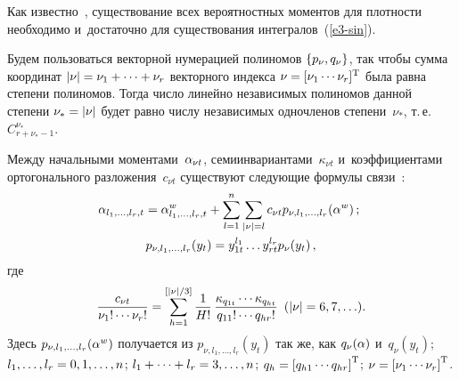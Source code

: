 \begin{multicols}{2}
Как известно~\cite{1-sin, 2-sin}, существование всех вероятностных моментов
для плот\-ности необходимо и~достаточно для существования интегралов~(\ref{e3-sin}).

Будем пользоваться векторной нумерацией полиномов
$\left\{ p_\nu, q_\nu\right\}$, так чтобы сумма координат
$|\nu | \hm= \nu_1 +\cdots +\nu_r$ векторного индекса
$\nu \hm= [\nu_1 \cdots \nu_r]^{\mathrm{T}}$ была равна степени полиномов.
Тогда число линейно независимых полиномов данной степени $\nu_* \hm= |\nu |$
будет равно числу независимых одночленов степени~$\nu_*$, т.\,е.\
$C_{r+\nu_*-1}^{\nu_*}$.

Между начальными  моментами~$\alpha_{\nu t}$, семиинвариантами~$\kappa_{\nu t}$
и~коэффициентами ортогонального разложения~$c_{\nu t}$
существуют следующие формулы связи~\cite{1-sin, 2-sin}:
    \begin{gather}
    \!\!\alpha_{l_1, \ldots,  l_r, t} =
    \alpha_{l_1, \ldots , l_r, t}^w + \sum\limits_{l=1}^n
    \sum\limits_{|\nu |=l} c_{\nu t} p_{\nu, l_1,\ldots,  l_r} (\alpha^w)\,;\notag
    \\
    p_{\nu, l_1, \ldots , l_r} (y_t) = y_{1t}^{l_1} \ldots y_{rt}^{l_r}
    p_\nu (y_t)\,,
   \label{e6-sin}
    \end{gather}
где
   \begin{equation*}
    \displaystyle\frac{\displaystyle c_{\nu t}\mathstrut}{\displaystyle \nu_1 ! \cdots \nu_r !\mathstrut} =
    \sum\limits_{h=1}^{[|\nu |/3]} \displaystyle\frac{\displaystyle 1\mathstrut}{\displaystyle H!\mathstrut}\,\displaystyle\frac{\displaystyle \kappa_{q_{1t}} \cdots \kappa_{q_{ht}}\mathstrut}{\displaystyle q_{11} ! \cdots q_{hr} ! \mathstrut}\enskip (|\nu | = 6,7,\ldots).
    \end{equation*}
Здесь  $p_{\nu,l_1, \ldots ,  l_r} (\alpha^w)$ получается из
$p_{\nu,l_1,\ldots , l_r} (y_t)$  так же, как
$q_\nu (\alpha)$  и~$q_\nu (y_t)$; $l_1,\ldots , l_r \hm= 0,1,\ldots , n$;
$l_1+\cdots+l_r\hm=
3, \ldots , n$; $ q_h \hm= \lk q_{h1}\cdots q_{hr}\rk^{\mathrm{T}}$;
$\nu \hm=\lk \nu_1 \cdots \nu_r\rk^{\mathrm{T}}$.


\end{multicols}
